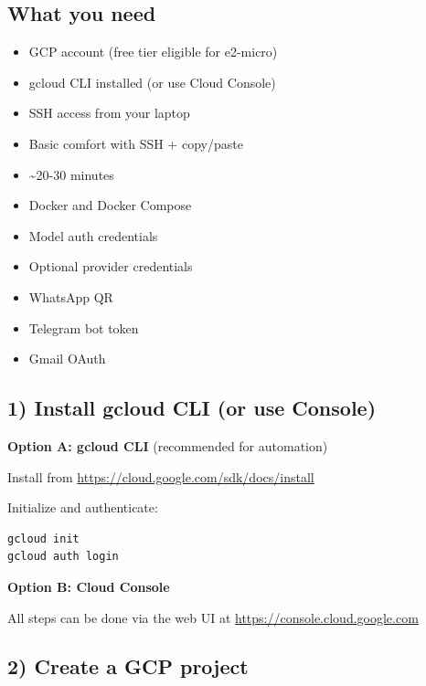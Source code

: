 \hrulefill


\subsection{What you need}


\begin{itemize}
  \item GCP account (free tier eligible for e2-micro)
  \item gcloud CLI installed (or use Cloud Console)
  \item SSH access from your laptop
  \item Basic comfort with SSH + copy/paste
  \item \textasciitilde{}20-30 minutes
  \item Docker and Docker Compose
  \item Model auth credentials
  \item Optional provider credentials
  \item WhatsApp QR
  \item Telegram bot token
  \item Gmail OAuth
\end{itemize}


\hrulefill


\subsection{1) Install gcloud CLI (or use Console)}


\textbf{Option A: gcloud CLI} (recommended for automation)

Install from \href{https://cloud.google.com/sdk/docs/install}{https://cloud.google.com/sdk/docs/install}

Initialize and authenticate:

\begin{lstlisting}[language=bash]
gcloud init
gcloud auth login
\end{lstlisting}


\textbf{Option B: Cloud Console}

All steps can be done via the web UI at \href{https://console.cloud.google.com}{https://console.cloud.google.com}

\hrulefill


\subsection{2) Create a GCP project}


